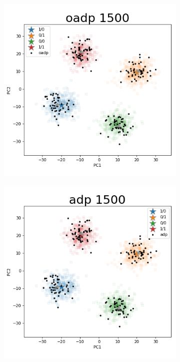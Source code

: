 \documentclass{article}
\begin{document}
\begin{figure}[p]
\begin{subfigure}{.5\textwidth}
\end{subfigure}
\hfill
\begin{subfigure}{.5\textwidth}
  \centering
  \includegraphics[width=.98\linewidth]{img/ggsim1500_100000_200_2_1_100_1_sturef_ggsim1500_100000_1500_2_1_100_0_oadp}
\end{subfigure}%
\begin{subfigure}{.5\textwidth}
  \centering
  \includegraphics[width=.98\linewidth]{img/ggsim1500_100000_200_2_1_100_1_sturef_ggsim1500_100000_1500_2_1_100_0_adp}
\end{subfigure}
\end{figure}
\end{document}

